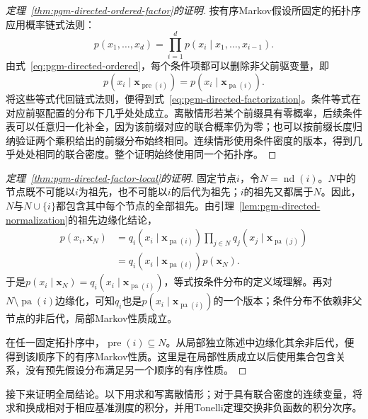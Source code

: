 \begin{proof}[定理~\ref{thm:pgm-directed-ordered-factor}的证明]
按有序Markov假设所固定的拓扑序应用概率链式法则：
\[
  p(x_1,\ldots,x_d)=
  \prod_{i=1}^{d}p(x_i\mid x_1,\ldots,x_{i-1}).
\]
由式~\eqref{eq:pgm-directed-ordered}，每个条件项都可以删除非父前驱变量，即
\[
  p(x_i\mid\bm{x}_{\operatorname{pre}(i)})
    =p(x_i\mid\bm{x}_{\operatorname{pa}(i)}).
\]
将这些等式代回链式法则，便得到式~\eqref{eq:pgm-directed-factorization}。条件等式在对应前驱配置的分布下几乎处处成立。离散情形若某个前缀具有零概率，后续条件表可以任意归一化补全，因为该前缀对应的联合概率仍为零；也可以按前缀长度归纳验证两个乘积给出的前缀分布始终相同。连续情形使用条件密度的版本，得到几乎处处相同的联合密度。整个证明始终使用同一个拓扑序。
\end{proof}

\begin{proof}[定理~\ref{thm:pgm-directed-factor-local}的证明]
固定节点$i$，令$N=\operatorname{nd}(i)$。$N$中的节点既不可能以$i$为祖先，也不可能以$i$的后代为祖先；$i$的祖先又都属于$N$。因此，$N$与$N\cup\{i\}$都包含其中每个节点的全部祖先。由引理~\ref{lem:pgm-directed-normalization}的祖先边缘化结论，
\[
  \begin{aligned}
    p(x_i,\bm{x}_N)
      &=q_i(x_i\mid\bm{x}_{\operatorname{pa}(i)})
        \prod_{j\in N}q_j(x_j\mid\bm{x}_{\operatorname{pa}(j)})\\
      &=q_i(x_i\mid\bm{x}_{\operatorname{pa}(i)})p(\bm{x}_N).
  \end{aligned}
\]
于是$p(x_i\mid\bm{x}_N)=q_i(x_i\mid\bm{x}_{\operatorname{pa}(i)})$，等式按条件分布的定义域理解。再对$N\setminus\operatorname{pa}(i)$边缘化，可知$q_i$也是$p(x_i\mid\bm{x}_{\operatorname{pa}(i)})$的一个版本；条件分布不依赖非父节点的非后代，局部Markov性质成立。

在任一固定拓扑序中，$\operatorname{pre}(i)\subseteq N$。从局部独立陈述中边缘化其余非后代，便得到该顺序下的有序Markov性质。这里是在局部性质成立以后使用集合包含关系，没有预先假设分布满足另一个顺序的有序性质。
\end{proof}

接下来证明全局结论。以下用求和写离散情形；对于具有联合密度的连续变量，将求和换成相对于相应基准测度的积分，并用Tonelli定理交换非负函数的积分次序。

